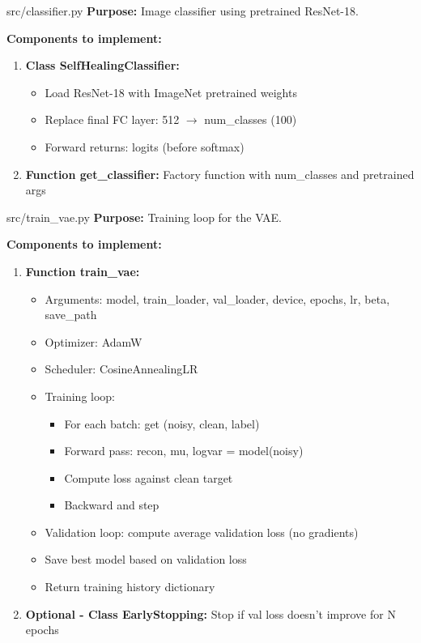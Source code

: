 \documentclass[11pt,a4paper]{article}
\begin{document}
\vspace{0.5cm}

\begin{filebox}{src/classifier.py}
\textbf{Purpose:} Image classifier using pretrained ResNet-18.

\textbf{Components to implement:}
\begin{enumerate}[noitemsep]
    \item \textbf{Class SelfHealingClassifier:}
    \begin{itemize}[noitemsep]
        \item Load ResNet-18 with ImageNet pretrained weights
        \item Replace final FC layer: 512 $\rightarrow$ num\_classes (100)
        \item Forward returns: logits (before softmax)
    \end{itemize}
    \item \textbf{Function get\_classifier:} Factory function with num\_classes and pretrained args
\end{enumerate}
\end{filebox}

\newpage

\begin{filebox}{src/train\_vae.py}
\textbf{Purpose:} Training loop for the VAE.

\textbf{Components to implement:}
\begin{enumerate}[noitemsep]
    \item \textbf{Function train\_vae:}
    \begin{itemize}[noitemsep]
        \item Arguments: model, train\_loader, val\_loader, device, epochs, lr, beta, save\_path
        \item Optimizer: AdamW
        \item Scheduler: CosineAnnealingLR
        \item Training loop:
        \begin{itemize}[noitemsep]
            \item For each batch: get (noisy, clean, label)
            \item Forward pass: recon, mu, logvar = model(noisy)
            \item Compute loss against clean target
            \item Backward and step
        \end{itemize}
        \item Validation loop: compute average validation loss (no gradients)
        \item Save best model based on validation loss
        \item Return training history dictionary
    \end{itemize}
    \item \textbf{Optional - Class EarlyStopping:} Stop if val loss doesn't improve for N epochs
\end{enumerate}
\end{filebox}
\end{document}
